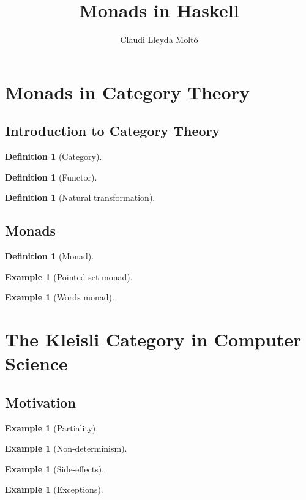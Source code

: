 \documentclass[a4paper]{article}
\title{Monads in Haskell}
\author{Claudi Lleyda Moltó}
\date{}
\theoremstyle{plain}
\newtheorem{example}[theorem]{Example}
\theoremstyle{definition}
\newtheorem{definition}[theorem]{Definition}
\begin{document}
\maketitle
\tableofcontents
\clearpage
\section{Monads in Category Theory}
\subsection{Introduction to Category Theory}
\begin{definition}[Category]
\end{definition}
\begin{definition}[Functor]
\end{definition}
\begin{definition}[Natural transformation]
\end{definition}
\subsection{Monads}
\begin{definition}[Monad]
\end{definition}
\begin{example}[Pointed set monad]
\end{example}
\begin{example}[Words monad]
\end{example}

\section{The Kleisli Category in Computer Science}
\subsection{Motivation}
\begin{example}[Partiality]
\end{example}
\begin{example}[Non-determinism]
\end{example}
\begin{example}[Side-effects]
\end{example}
\begin{example}[Exceptions]
\end{example}
\end{document}
